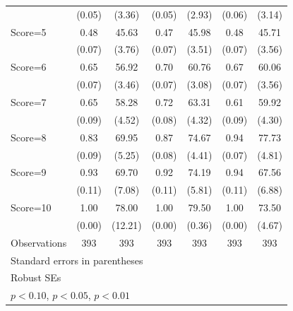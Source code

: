 \begin{table}[htbp]
\begin{tabular}{l*{6}{c}}
                &   (0.05)         &   (3.36)         &   (0.05)         &   (2.93)         &   (0.06)         &   (3.14)         \\
Score=5         &     0.48\sym{***}&    45.63\sym{***}&     0.47\sym{***}&    45.98\sym{***}&     0.48\sym{***}&    45.71\sym{***}\\
                &   (0.07)         &   (3.76)         &   (0.07)         &   (3.51)         &   (0.07)         &   (3.56)         \\
Score=6         &     0.65\sym{***}&    56.92\sym{***}&     0.70\sym{***}&    60.76\sym{***}&     0.67\sym{***}&    60.06\sym{***}\\
                &   (0.07)         &   (3.46)         &   (0.07)         &   (3.08)         &   (0.07)         &   (3.56)         \\
Score=7         &     0.65\sym{***}&    58.28\sym{***}&     0.72\sym{***}&    63.31\sym{***}&     0.61\sym{***}&    59.92\sym{***}\\
                &   (0.09)         &   (4.52)         &   (0.08)         &   (4.32)         &   (0.09)         &   (4.30)         \\
Score=8         &     0.83\sym{***}&    69.95\sym{***}&     0.87\sym{***}&    74.67\sym{***}&     0.94\sym{***}&    77.73\sym{***}\\
                &   (0.09)         &   (5.25)         &   (0.08)         &   (4.41)         &   (0.07)         &   (4.81)         \\
Score=9         &     0.93\sym{***}&    69.70\sym{***}&     0.92\sym{***}&    74.19\sym{***}&     0.94\sym{***}&    67.56\sym{***}\\
                &   (0.11)         &   (7.08)         &   (0.11)         &   (5.81)         &   (0.11)         &   (6.88)         \\
Score=10        &     1.00\sym{***}&    78.00\sym{***}&     1.00\sym{***}&    79.50\sym{***}&     1.00\sym{***}&    73.50\sym{***}\\
                &   (0.00)         &  (12.21)         &   (0.00)         &   (0.36)         &   (0.00)         &   (4.67)         \\
\hline
Observations    &      393         &      393         &      393         &      393         &      393         &      393         \\
\hline\hline
\multicolumn{7}{l}{\footnotesize Standard errors in parentheses}\\
\multicolumn{7}{l}{\footnotesize Robust SEs}\\
\multicolumn{7}{l}{\footnotesize \sym{*} \(p<0.10\), \sym{**} \(p<0.05\), \sym{***} \(p<0.01\)}\\
\end{tabular}
\end{table}
